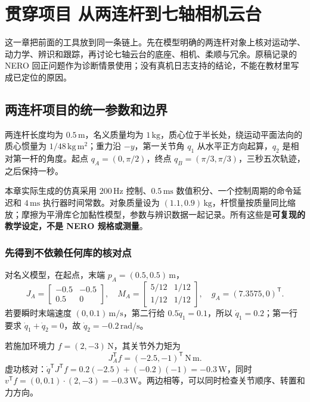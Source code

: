 \chapter{贯穿项目 从两连杆到七轴相机云台}
\label{ch:integration}

这一章把前面的工具放到同一条链上。先在模型明确的两连杆对象上核对运动学、动力学、辨识和跟踪，再讨论七轴云台的底座、相机、柔顺与冗余。原稿记录的 NERO 回正问题作为诊断情景使用；没有真机日志支持的结论，不能在教材里写成已定位的原因。

\section{两连杆项目的统一参数和边界}

两连杆长度均为 $0.5\,\mathrm m$，名义质量均为 $1\,\mathrm{kg}$，质心位于半长处，绕运动平面法向的质心惯量为 $1/48\,\mathrm{kg\,m^2}$；重力沿 $-y$，第一关节角 $q_1$ 从水平正方向起算，$q_2$ 是相对第一杆的角度。起点 $q_A=(0,\pi/2)$，终点 $q_B=(\pi/3,\pi/3)$，三秒五次轨迹，之后保持一秒。

本章实际生成的仿真采用 $200\,\mathrm{Hz}$ 控制、$0.5\,\mathrm{ms}$ 数值积分、一个控制周期的命令延迟和 $4\,\mathrm{ms}$ 执行器时间常数。对象质量设为 $(1.1,0.9)\,\mathrm{kg}$，杆惯量按质量同比缩放；摩擦为平滑库仑加黏性模型，参数与辨识数据一起记录。所有这些是\textbf{可复现的教学设定，不是 NERO 规格或测量}。

\subsection{先得到不依赖任何库的核对点}

对名义模型，在起点，末端 $p_A=(0.5,0.5)\,\mathrm m$，
\begin{equation}
J_A=\begin{bmatrix}-0.5&-0.5\\0.5&0\end{bmatrix},\quad
M_A=\begin{bmatrix}5/12&1/12\\1/12&1/12\end{bmatrix},\quad
g_A=(7.3575,0)^\mathsf T.
\end{equation}
若要瞬时末端速度 $(0,0.1)\,\mathrm{m/s}$，第二行给 $0.5\dot q_1=0.1$，所以 $\dot q_1=0.2$；第一行要求 $\dot q_1+\dot q_2=0$，故 $\dot q_2=-0.2\,\mathrm{rad/s}$。

若施加环境力 $f=(2,-3)\,\mathrm N$，其关节外力矩为
\[
J_A^\mathsf Tf=(-2.5,-1)^\mathsf T\,\mathrm{N\,m}.
\]
虚功核对：$\dot q^\mathsf TJ^\mathsf Tf=0.2(-2.5)+(-0.2)(-1)=-0.3\,\mathrm W$，同时 $v^\mathsf Tf=(0,0.1)\cdot(2,-3)=-0.3\,\mathrm W$。两边相等，可以同时检查关节顺序、转置和力方向。

